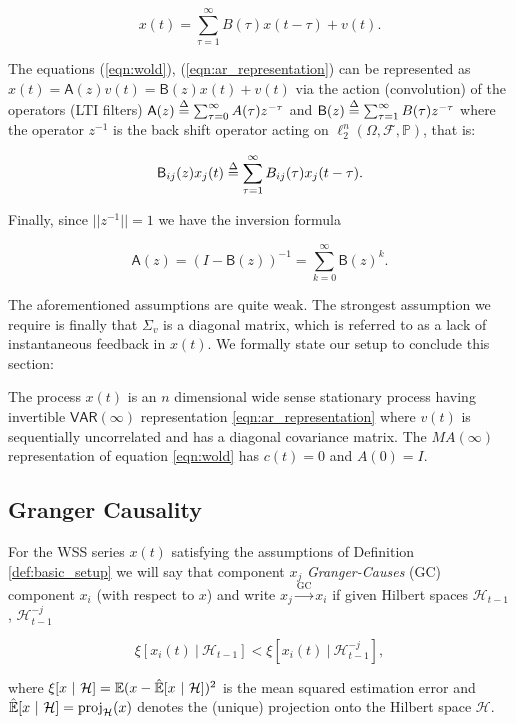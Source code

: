 \documentclass[12pt]{article}
\def\gc{\overset{\text{GC}}{\rightarrow}}  %
\def\VAR{\mathsf{VAR}}  %
\def\B{\mathsf{B}}  %
\def\A{\mathsf{A}}  %
\def\H{\mathcal{H}}  %
\newcommand{\linE}[2]{\hat{\E}[#1\ |\ #2]}  %
\newcommand{\linEerr}[2]{\xi[#1\ |\ #2]}  %
\begin{document}
\begin{equation}
  \label{eqn:ar_representation}
  x(t) = \sum_{\tau = 1}^\infty B(\tau) x(t - \tau) + v(t).
\end{equation}

The equations (\ref{eqn:wold}), (\ref{eqn:ar_representation}) can be
represented as $x(t) = \A(z)v(t) = \B(z)x(t) + v(t)$ via the action
(convolution) of the operators (LTI filters)
$\A(z) \defeq \sum_{\tau = 0}^\infty A(\tau)z^{-\tau}$ and
$\B(z) \defeq \sum_{\tau = 1}^\infty B(\tau)z^{-\tau}$ where the
operator $z^{-1}$ is the back shift operator acting on
$\ell_2^n(\Omega, \mathcal{F}, \mathbb{P})$, that is:

\begin{equation}
  \label{eqn:filter_action}
  \B_{ij}(z)x_j(t) \defeq \sum_{\tau = 1}^\infty B_{ij}(\tau)x_j(t - \tau).
\end{equation}

Finally, since $||z^{-1}|| = 1$ we have the inversion formula

\begin{equation}
  \label{eqn:lsi_inversion}
  \A(z) = (I - \B(z))^{-1} = \sum_{k = 0}^\infty \B(z)^k.
\end{equation}

The aforementioned assumptions are quite weak.  The strongest
assumption we require is finally that $\Sigma_v$ is a diagonal matrix,
which is referred to as a lack of instantaneous feedback in $x(t)$.
We formally state our setup to conclude this section:

\begin{definition}
  \label{def:basic_setup}
  The process $x(t)$ is an $n$ dimensional wide sense stationary
  process having invertible $\VAR(\infty)$ representation
  \eqref{eqn:ar_representation} where $v(t)$ is sequentially
  uncorrelated and has a diagonal covariance matrix.  The $MA(\infty)$
  representation of equation \eqref{eqn:wold} has $c(t) = 0$ and
  $A(0) = I$.
\end{definition}


\subsection{Granger Causality}

\begin{definition}
  \label{def:granger_causality}
  For the WSS series $x(t)$ satisfying the assumptions of Definition
  \ref{def:basic_setup} we will say that component $x_j$
  \textit{Granger-Causes} (GC) component $x_i$ (with respect to $x$)
  and write $x_j \gc x_i$ if given Hilbert spaces $\H_{t - 1}$,
  $\H^{-j}_{t - 1}$

\begin{equation}
  \linEerr{x_i(t)}{\H_{t - 1}} < \linEerr{x_i(t)}{\H^{-j}_{t - 1}},
\end{equation}

where $\xi[x \ |\ \H] = \E (x - \linE{x}{\H})^2$ is the mean squared
estimation error and $\linE{x}{\H} = \text{proj}_{\H}(x)$ denotes the
(unique) projection onto the Hilbert space $\H$.
\end{definition}
\end{document}
